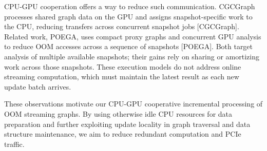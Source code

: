 CPU-GPU cooperation offers a way to reduce such communication. CGCGraph processes shared graph data on the GPU and assigns snapshot-specific work to the CPU, reducing transfers across concurrent snapshot jobs [CGCGraph]. Related work, POEGA, uses compact proxy graphs and concurrent GPU analysis to reduce OOM accesses across a sequence of snapshots [POEGA]. Both target analysis of multiple available snapshots; their gains rely on sharing or amortizing work across those snapshots. These execution models do not address online streaming computation, which must maintain the latest result as each new update batch arrives.

These observations motivate our CPU-GPU cooperative incremental processing of OOM streaming graphs. By using otherwise idle CPU resources for data preparation and further exploiting update locality in graph traversal and data structure maintenance, we aim to reduce redundant computation and PCIe traffic.
